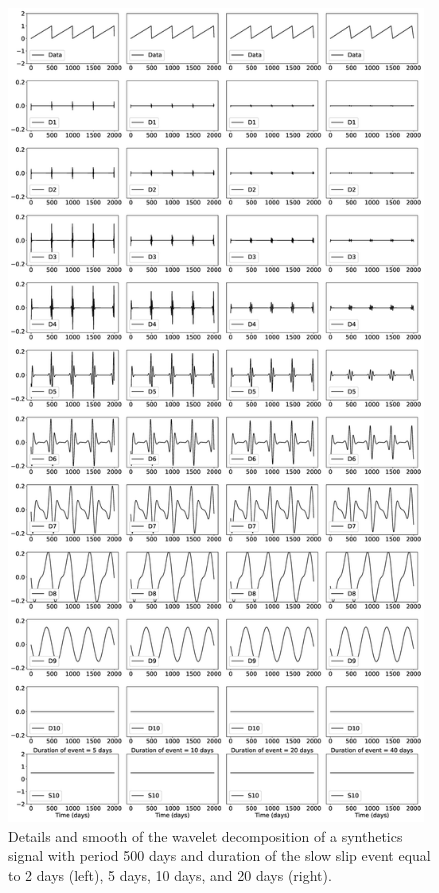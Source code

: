 \documentclass{article}
\begin{document}
\begin{figure}
\noindent\includegraphics[width=11cm, trim={0cm 0cm 0cm 0cm},clip]{figures/500_DS.eps}
\caption{Details and smooth of the wavelet decomposition of a synthetics signal with period 500 days and duration of the slow slip event equal to 2 days (left), 5 days, 10 days, and 20 days (right).}
\label{pngfiguresample}
\end{figure}
\end{document}
